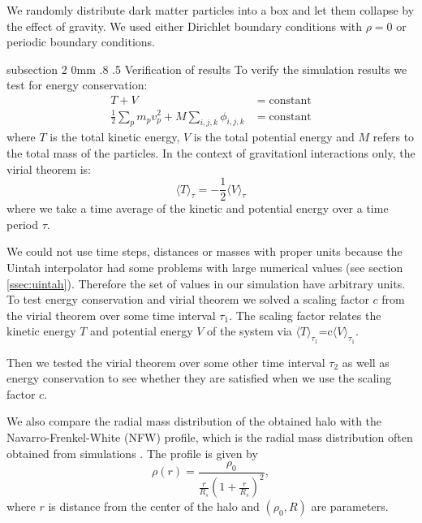 \documentclass[notitlepage, 12pt]{article}
\makeatletter
\renewcommand{\subsection}{\@startsection    %
        {subsection}
        {2}
        {0mm}
        {.8\baselineskip}
        {.5\baselineskip}
        {\bfseries\normalsize}}
\makeatother
\begin{document}
We randomly distribute dark matter particles into a box and let them collapse by the effect of gravity. We used either Dirichlet boundary conditions with $\rho=0$ or periodic boundary conditions.    

\subsection{Verification of results} \label{sec:verification}
To verify the simulation results we test for energy conservation:
\begin{align}
T+V&=\mathrm{constant}\\
\frac{1}{2}\sum_{p} m_pv_p^2 + M\sum_{i,j,k}\phi_{i,j,k} &= \mathrm{constant} 
\end{align}
where $T$ is the total kinetic energy, $V$ is the total potential energy and $M$ refers to the total mass of the particles. In the context of gravitationl interactions only, the virial theorem is:
\begin{equation}
\langle T \rangle_\tau = -\frac{1}{2}\langle V \rangle_\tau
\end{equation}
where we take a time average of the kinetic and potential energy over a time period $\tau$.

We could not use time steps, distances or masses with proper units because the Uintah interpolator had some problems with large numerical values (see section \ref{ssec:uintah}). Therefore the set of values in our simulation have arbitrary units. To test energy conservation and virial theorem we solved a scaling factor $c$ from the virial theorem over some time interval $\tau_1$. The scaling factor relates the kinetic energy $T$ and potential energy $V$ of the system via $\langle T \rangle_{\tau_1}$=c$\langle V\rangle_{\tau_1}$.

Then we tested the virial theorem over some other time interval $\tau_2$ as well as energy conservation to see whether they are satisfied when we use the scaling factor $c$.  

We also compare the radial mass distribution of the obtained halo with the Navarro-Frenkel-White (NFW) profile, which is the radial mass distribution often obtained from simulations \citep{Navarro1995}. The profile is given by  
\begin{equation}
\rho(r) = \frac{\rho_0}{\frac{r}{R_s}\left(1 + \frac{r}{R_s}\right)^2},
\label{eq:nfw}
\end{equation}
where $r$ is distance from the center of the halo and $(\rho_0,R)$ are parameters.    
\end{document}
